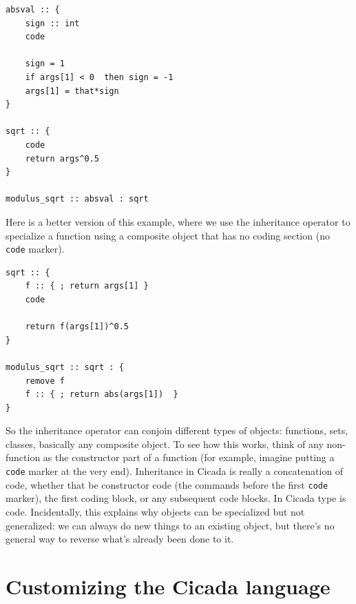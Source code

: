 \documentclass{article}
\newenvironment{code}{
       \begin{list}{}{
               \setlength{\leftmargin}{.4in}
               \setlength{\rightmargin}{0in}
               \setlength{\topsep}{.2in}
       }
       \small
       \item[] }
       { \end{list}   }
\begin{document}
\begin{code} \begin{verbatim}
absval :: {
    sign :: int
    code
    
    sign = 1
    if args[1] < 0  then sign = -1
    args[1] = that*sign
}

sqrt :: {
    code
    return args^0.5
}

modulus_sqrt :: absval : sqrt
\end{verbatim} \end{code}

Here is a better version of this example, where we use the inheritance operator to specialize a function using a composite object that has no coding section (no \verb#code# marker).

\begin{code} \begin{verbatim}
sqrt :: {
    f :: { ; return args[1] }
    code

    return f(args[1])^0.5
}

modulus_sqrt :: sqrt : {
    remove f
    f :: { ; return abs(args[1])  }
}
\end{verbatim} \end{code}

\noindent So the inheritance operator can conjoin different types of objects:  functions, sets, classes, basically any composite object.  To see how this works, think of any non-function as the constructor part of a function (for example, imagine putting a \verb#code# marker at the very end).  Inheritance in Cicada is really a concatenation of code, whether that be constructor code (the commands before the first \verb#code# marker), the first coding block, or any subsequent code blocks.  In Cicada type is code.  Incidentally, this explains why objects can be specialized but not generalized:  we can always do new things to an existing object, but there's no general way to reverse what's already been done to it.



\newpage








\section{Customizing the Cicada language}
\end{document}
